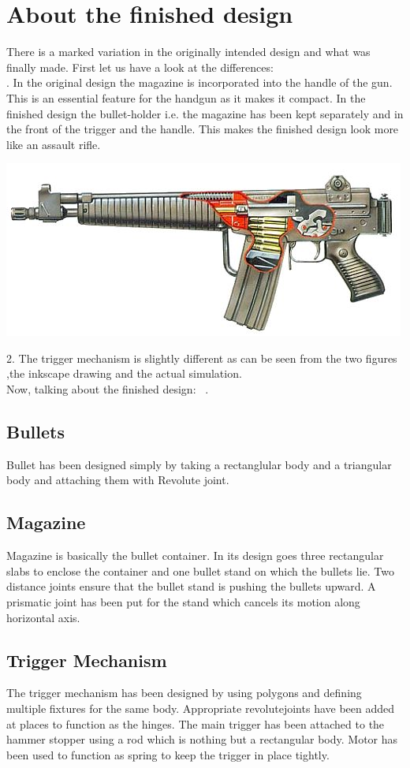 \documentclass [11pt]{report}
\begin{document}
\section{About the finished design}
There is a marked variation in the originally intended design and what was finally made. First let us have a look at the differences:\\ 
. In the original design the magazine is incorporated into the handle of the gun. This is an essential feature for the handgun as it makes it compact. In the finished design the bullet-holder i.e. the magazine has been kept separately and in the front of the trigger and the handle. This makes the finished design look more like an assault rifle.
\begin{center}
\includegraphics[scale=0.4]{./images/assault.jpg}
\end{center}
2. The trigger mechanism is slightly different as can be seen from the two figures ,the inkscape drawing and the actual simulation.\\
Now, talking about the finished design:
~\cite{b2dm}.
\subsection{Bullets}
Bullet has been designed simply by taking a rectanglular body and a triangular body and attaching them with Revolute joint.
\subsection{Magazine}
Magazine is basically the bullet container. In its design goes three rectangular slabs to enclose the container and one bullet stand on which the bullets lie. Two distance joints ensure that the bullet stand is pushing the bullets upward. A prismatic joint has been put for the stand which cancels its motion along horizontal axis.
\subsection{Trigger Mechanism}
The trigger mechanism has been designed by using polygons and defining multiple fixtures for the same body. Appropriate revolutejoints have been added at places to function as the hinges. The main trigger has been attached to the hammer stopper using a rod which is nothing but a rectangular body. Motor has been used to function as spring to keep the trigger in place tightly.
\end{document}
